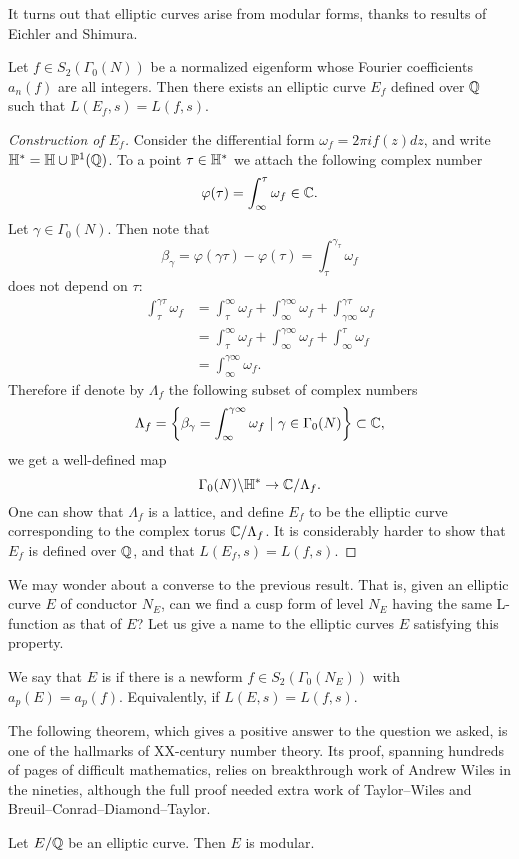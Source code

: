 It turns out that elliptic curves arise from modular forms, thanks to results of Eichler and Shimura.
\begin{theorem}
  Let $f\in S_2(\Gamma_0(N))$ be a normalized eigenform whose Fourier coefficients $a_n(f)$ are all integers. Then there exists an elliptic curve $E_f$ defined over $\mathbb{Q}$ such that $L(E_f,s)=L(f,s)$.
\end{theorem}
\begin{proof}[Construction of $E_f$]
  Consider the differential form $\omega_f=2\pi i f(z)dz$, and write $\mathbb{H}^*=\mathbb{H}\cup\mathbb{P}^1(\mathbb{Q})$. To a point $\tau\in\mathbb{H}^*$ we attach the following complex number
\[
\varphi(\tau) = \int_{\infty}^\tau \omega_f \in\mathbb{C}.
\]
Let $\gamma\in\Gamma_0(N)$. Then note that
\[
\beta_{\gamma} =\varphi(\gamma\tau)-\varphi(\tau) = \int_{\tau}^{\gamma_\tau} \omega_f
\]
does not depend on $\tau$:
\begin{align*}
\int_\tau^{\gamma\tau}\omega_f &= \int_\tau^\infty\omega_f+\int_\infty^{\gamma\infty}\omega_f+ \int_{\gamma\infty}^{\gamma\tau}\omega_f\\
&= \int_\tau^\infty\omega_f+\int_\infty^{\gamma\infty}\omega_f+ \int_{\infty}^{\tau}\omega_f\\
&=\int_\infty^{\gamma\infty}\omega_f.
\end{align*}
Therefore if denote by $\Lambda_f$ the following subset of complex numbers
\[
\Lambda_f=\left\{\beta_\gamma=\int_{\infty}^{\gamma\infty}\omega_f ~|~ \gamma\in\Gamma_0(N)\right\}\subset\mathbb{C},
\]
we get a well-defined map
\[
\Gamma_0(N)\backslash \mathbb{H}^*\to \mathbb{C}/\Lambda_f.
\]
One can show that $\Lambda_f$ is a lattice, and define $E_f$ to be the elliptic curve corresponding to the complex torus $\mathbb{C}/\Lambda_f$. It is considerably harder to show that $E_f$ is defined over $\mathbb{Q}$, and that $L(E_f,s)=L(f,s)$.
\end{proof}

We may wonder about a converse to the previous result. That is, given an elliptic curve $E$ of conductor $N_E$, can we find a cusp form of level $N_E$ having the same L-function as that of $E$? Let us give a name to the elliptic curves $E$ satisfying this property.

\begin{definition}
  We say that $E$ is  if there is a newform $f\in S_2(\Gamma_0(N_E))$ with $a_p(E)=a_p(f)$.   Equivalently, if $L(E,s)=L(f,s)$.
\end{definition}

The following theorem, which gives a positive answer to the question we asked, is one of the hallmarks of XX-century number theory. Its proof, spanning hundreds of pages of difficult mathematics, relies on breakthrough work of Andrew Wiles in the nineties, although the full proof needed extra work of Taylor--Wiles and  Breuil--Conrad--Diamond--Taylor.
\begin{theorem}
  Let $E/\mathbb{Q}$ be an elliptic curve. Then $E$ is modular.
\end{theorem}

